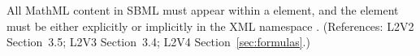 All MathML content in SBML must appear within a 
element, and the  element must be either explicitly or
implicitly in the XML namespace
.  (References: L2V2
Section~3.5; L2V3 Section~3.4; L2V4 Section~\ref{sec:formulas}.)
